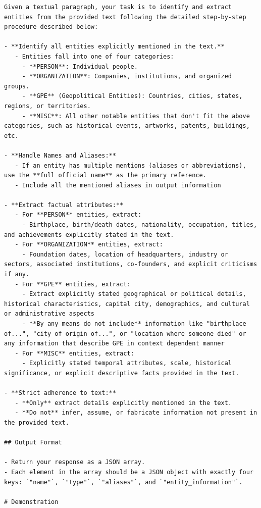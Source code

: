 \documentclass{article}
\begin{document}
\begin{lstlisting}[style=promptstyle, caption={NER prompt},label={lst:ner}]
Given a textual paragraph, your task is to identify and extract entities from the provided text following the detailed step-by-step procedure described below:

- **Identify all entities explicitly mentioned in the text.**
   - Entities fall into one of four categories:
     - **PERSON**: Individual people.
     - **ORGANIZATION**: Companies, institutions, and organized groups.
     - **GPE** (Geopolitical Entities): Countries, cities, states, regions, or territories.
     - **MISC**: All other notable entities that don't fit the above categories, such as historical events, artworks, patents, buildings, etc.

- **Handle Names and Aliases:**
   - If an entity has multiple mentions (aliases or abbreviations), use the **full official name** as the primary reference.
   - Include all the mentioned aliases in output information

- **Extract factual attributes:**
   - For **PERSON** entities, extract:
     - Birthplace, birth/death dates, nationality, occupation, titles, and achievements explicitly stated in the text.
   - For **ORGANIZATION** entities, extract:
     - Foundation dates, location of headquarters, industry or sectors, associated institutions, co-founders, and explicit criticisms if any.
   - For **GPE** entities, extract:
     - Extract explicitly stated geographical or political details, historical characteristics, capital city, demographics, and cultural or administrative aspects
     - **By any means do not include** information like "birthplace of...", "city of origin of...", or "location where someone died" or any information that describe GPE in context dependent manner
   - For **MISC** entities, extract:
     - Explicitly stated temporal attributes, scale, historical significance, or explicit descriptive facts provided in the text.

- **Strict adherence to text:**
   - **Only** extract details explicitly mentioned in the text.
   - **Do not** infer, assume, or fabricate information not present in the provided text.

## Output Format

- Return your response as a JSON array.
- Each element in the array should be a JSON object with exactly four keys: `"name"`, `"type"`, `"aliases"`, and `"entity_information"`.

# Demonstration


\end{lstlisting}
\end{document}

